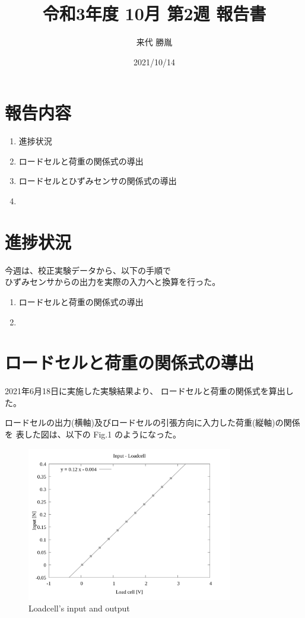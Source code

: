 \documentclass[twocolumn,a4j]{jsarticle}
\author{来代 勝胤}
\title{令和3年度 10月 第2週 報告書}
\date{2021/10/14}
\begin{document}
\columnseprule=0.1mm

\maketitle
\section*{報告内容}
\begin{enumerate}[1.]
    \item 進捗状況
    \item ロードセルと荷重の関係式の導出
    \item ロードセルとひずみセンサの関係式の導出
    \item 
\end{enumerate}
\section{進捗状況}
今週は、校正実験データから、以下の手順で\\
ひずみセンサからの出力を実際の入力へと換算を行った。
\begin{enumerate}[(1)]
    \item ロードセルと荷重の関係式の導出
    \item 
\end{enumerate}
\section{ロードセルと荷重の関係式の導出}
2021年6月18日に実施した実験結果より、
ロードセルと荷重の関係式を算出した。\par
ロードセルの出力(横軸)及びロードセルの引張方向に入力した荷重(縦軸)の関係を
表した図は、以下の Fig.1 のようになった。
\begin{figure}[htbp]
    \footnotesize
    \begin{center}
        \includegraphics[width=90mm]{images/02_force&line.png}
        \caption{Loadcell's input and output}
    \end{center}
\end{figure}
\end{document}
